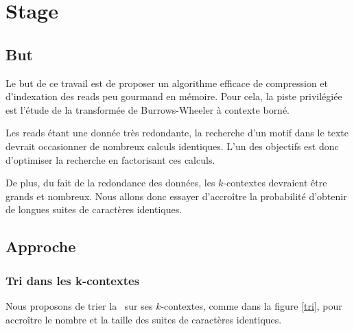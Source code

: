 \section{Stage}

\subsection{But}
Le but de ce travail est de proposer un algorithme efficace de compression et d'indexation des reads peu gourmand en mémoire. Pour cela, la piste privilégiée est l'étude de la transformée de Burrows-Wheeler à contexte borné. 

Les reads étant une donnée très redondante, la recherche d'un motif dans le texte devrait occasionner de nombreux calculs identiques. L'un des objectifs est donc d'optimiser la recherche en factorisant ces calculs. 

De plus, du fait de la redondance des données, les $k$-contextes devraient être grands et nombreux. Nous allons donc essayer d'accroître la probabilité d'obtenir de longues suites de caractères identiques.


\subsection{Approche}

\subsubsection{Tri dans les k-contextes}
Nous proposons de trier la \kbwt\ sur ses $k$-contextes, comme dans la figure \ref{tri}, pour accroître le nombre et la taille des suites de caractères identiques.

